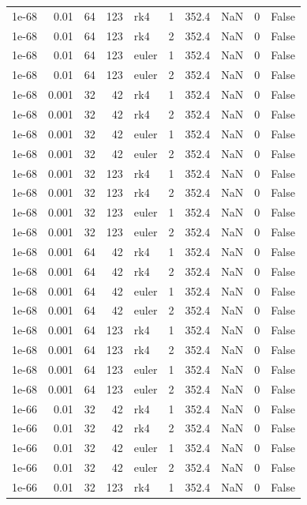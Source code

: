 \begin{tabular}{rrrrlrrrrr}
1e-68 & 0.01 & 64 & 123 & rk4 & 1 & 352.4 & NaN & 0 & False \\
1e-68 & 0.01 & 64 & 123 & rk4 & 2 & 352.4 & NaN & 0 & False \\
1e-68 & 0.01 & 64 & 123 & euler & 1 & 352.4 & NaN & 0 & False \\
1e-68 & 0.01 & 64 & 123 & euler & 2 & 352.4 & NaN & 0 & False \\
1e-68 & 0.001 & 32 & 42 & rk4 & 1 & 352.4 & NaN & 0 & False \\
1e-68 & 0.001 & 32 & 42 & rk4 & 2 & 352.4 & NaN & 0 & False \\
1e-68 & 0.001 & 32 & 42 & euler & 1 & 352.4 & NaN & 0 & False \\
1e-68 & 0.001 & 32 & 42 & euler & 2 & 352.4 & NaN & 0 & False \\
1e-68 & 0.001 & 32 & 123 & rk4 & 1 & 352.4 & NaN & 0 & False \\
1e-68 & 0.001 & 32 & 123 & rk4 & 2 & 352.4 & NaN & 0 & False \\
1e-68 & 0.001 & 32 & 123 & euler & 1 & 352.4 & NaN & 0 & False \\
1e-68 & 0.001 & 32 & 123 & euler & 2 & 352.4 & NaN & 0 & False \\
1e-68 & 0.001 & 64 & 42 & rk4 & 1 & 352.4 & NaN & 0 & False \\
1e-68 & 0.001 & 64 & 42 & rk4 & 2 & 352.4 & NaN & 0 & False \\
1e-68 & 0.001 & 64 & 42 & euler & 1 & 352.4 & NaN & 0 & False \\
1e-68 & 0.001 & 64 & 42 & euler & 2 & 352.4 & NaN & 0 & False \\
1e-68 & 0.001 & 64 & 123 & rk4 & 1 & 352.4 & NaN & 0 & False \\
1e-68 & 0.001 & 64 & 123 & rk4 & 2 & 352.4 & NaN & 0 & False \\
1e-68 & 0.001 & 64 & 123 & euler & 1 & 352.4 & NaN & 0 & False \\
1e-68 & 0.001 & 64 & 123 & euler & 2 & 352.4 & NaN & 0 & False \\
1e-66 & 0.01 & 32 & 42 & rk4 & 1 & 352.4 & NaN & 0 & False \\
1e-66 & 0.01 & 32 & 42 & rk4 & 2 & 352.4 & NaN & 0 & False \\
1e-66 & 0.01 & 32 & 42 & euler & 1 & 352.4 & NaN & 0 & False \\
1e-66 & 0.01 & 32 & 42 & euler & 2 & 352.4 & NaN & 0 & False \\
1e-66 & 0.01 & 32 & 123 & rk4 & 1 & 352.4 & NaN & 0 & False \\

\end{tabular}
